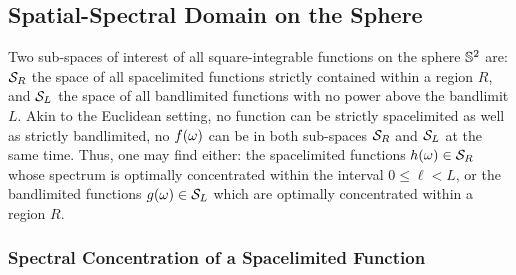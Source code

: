

\subsection{Spatial-Spectral Domain on the Sphere}\label{sec:chapter2_spatial_spectral_domain_sphere}

Two sub-spaces of interest of all square-integrable functions on the sphere \(\mathbb{S}^{2}{}\) are: \(\mathcal{S}_{R}{}\) the space of all spacelimited functions strictly contained within a region \(R\), and \(\mathcal{S}_{L}{}\) the space of all bandlimited functions with no power above the bandlimit \(L\).
Akin to the Euclidean setting, no function can be strictly spacelimited as well as strictly bandlimited, \ie{} no \(f(\omega)\) can be in both sub-spaces \(\mathcal{S}_{R}{}\) and \(\mathcal{S}_{L}{}\) at the same time.
Thus, one may find either: the spacelimited functions \(h(\omega) \in \mathcal{S}_{R}{}\) whose spectrum is optimally concentrated within the interval \(0 \leq \ell < L\), or the bandlimited functions \(g(\omega) \in \mathcal{S}_{L}{}\) which are optimally concentrated within a region \(R\).

\subsubsection{Spectral Concentration of a Spacelimited Function}

